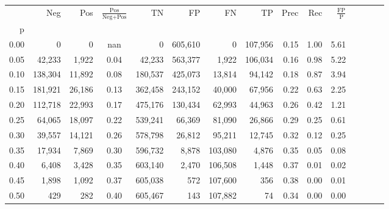 \begin{tabular}{rrrcrrrrrrrrrrr}
\toprule
{} &      Neg &     Pos & $\frac{\text{Pos}}{\text{Neg}+\text{Pos}}$ &       TN &       FP &       FN &       TP &  Prec &   Rec & $\frac{\text{FP}}{\text{P}}$ \\
p    &          &         &                                            &          &          &          &          &       &       &                              \\
\midrule
0.00 &        0 &       0 &                                        nan &        0 &  605,610 &        0 &  107,956 &  0.15 &  1.00 &                         5.61 \\
0.05 &   42,233 &   1,922 &                                       0.04 &   42,233 &  563,377 &    1,922 &  106,034 &  0.16 &  0.98 &                         5.22 \\
0.10 &  138,304 &  11,892 &                                       0.08 &  180,537 &  425,073 &   13,814 &   94,142 &  0.18 &  0.87 &                         3.94 \\
0.15 &  181,921 &  26,186 &                                       0.13 &  362,458 &  243,152 &   40,000 &   67,956 &  0.22 &  0.63 &                         2.25 \\
0.20 &  112,718 &  22,993 &                                       0.17 &  475,176 &  130,434 &   62,993 &   44,963 &  0.26 &  0.42 &                         1.21 \\
0.25 &   64,065 &  18,097 &                                       0.22 &  539,241 &   66,369 &   81,090 &   26,866 &  0.29 &  0.25 &                         0.61 \\
0.30 &   39,557 &  14,121 &                                       0.26 &  578,798 &   26,812 &   95,211 &   12,745 &  0.32 &  0.12 &                         0.25 \\
0.35 &   17,934 &   7,869 &                                       0.30 &  596,732 &    8,878 &  103,080 &    4,876 &  0.35 &  0.05 &                         0.08 \\
0.40 &    6,408 &   3,428 &                                       0.35 &  603,140 &    2,470 &  106,508 &    1,448 &  0.37 &  0.01 &                         0.02 \\
0.45 &    1,898 &   1,092 &                                       0.37 &  605,038 &      572 &  107,600 &      356 &  0.38 &  0.00 &                         0.01 \\
0.50 &      429 &     282 &                                       0.40 &  605,467 &      143 &  107,882 &       74 &  0.34 &  0.00 &                         0.00 \\

\end{tabular}
